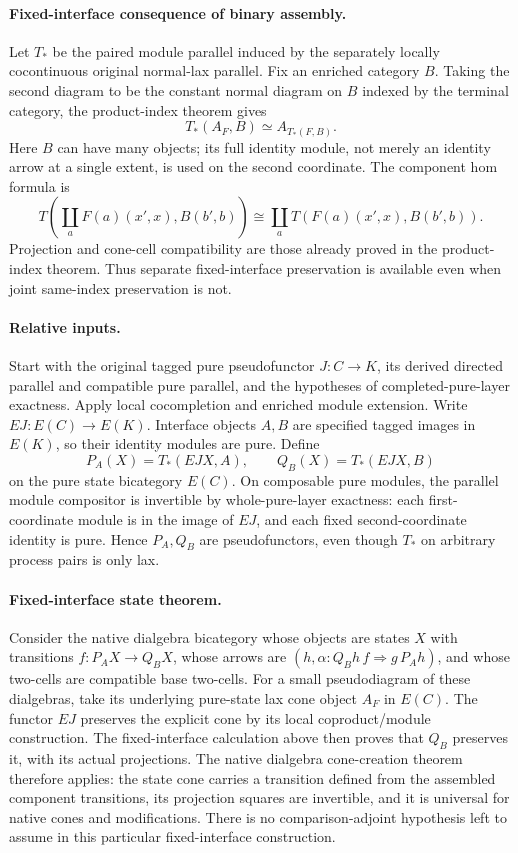 \documentclass{article}
\begin{document}
\paragraph{Fixed-interface consequence of binary assembly.} Let $T_*$ be the paired module parallel induced by the separately locally cocontinuous original normal-lax parallel. Fix an enriched category $B$. Taking the second diagram to be the constant normal diagram on $B$ indexed by the terminal category, the product-index theorem gives
\[
 T_*(A_F,B)\simeq A_{T_*(F,B)}.
\]
Here $B$ can have many objects; its full identity module, not merely an identity arrow at a single extent, is used on the second coordinate. The component hom formula is
\[
 T\!\left(\coprod_a F(a)(x',x), B(b',b)\right)
 \cong\coprod_a T(F(a)(x',x),B(b',b)).
\]
Projection and cone-cell compatibility are those already proved in the product-index theorem. Thus separate fixed-interface preservation is available even when joint same-index preservation is not.

\paragraph{Relative inputs.} Start with the original tagged pure pseudofunctor $J:C\to K$, its derived directed parallel and compatible pure parallel, and the hypotheses of completed-pure-layer exactness. Apply local cocompletion and enriched module extension. Write $EJ:E(C)\to E(K)$. Interface objects $A,B$ are specified tagged images in $E(K)$, so their identity modules are pure. Define
\[
 P_A(X)=T_*(EJX,A),\qquad Q_B(X)=T_*(EJX,B)
\]
on the pure state bicategory $E(C)$. On composable pure modules, the parallel module compositor is invertible by whole-pure-layer exactness: each first-coordinate module is in the image of $EJ$, and each fixed second-coordinate identity is pure. Hence $P_A,Q_B$ are pseudofunctors, even though $T_*$ on arbitrary process pairs is only lax.

\paragraph{Fixed-interface state theorem.} Consider the native dialgebra bicategory whose objects are states $X$ with transitions $f:P_A X\to Q_B X$, whose arrows are $(h,\alpha:Q_Bh\,f\Rightarrow g\,P_Ah)$, and whose two-cells are compatible base two-cells. For a small pseudodiagram of these dialgebras, take its underlying pure-state lax cone object $A_F$ in $E(C)$. The functor $EJ$ preserves the explicit cone by its local coproduct/module construction. The fixed-interface calculation above then proves that $Q_B$ preserves it, with its actual projections. The native dialgebra cone-creation theorem therefore applies: the state cone carries a transition defined from the assembled component transitions, its projection squares are invertible, and it is universal for native cones and modifications. There is no comparison-adjoint hypothesis left to assume in this particular fixed-interface construction.
\end{document}
